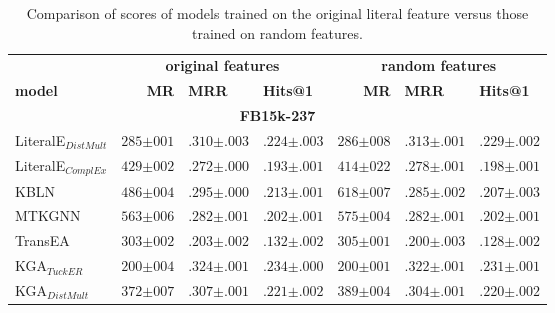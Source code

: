 
\begin{table*}[]
\setlength{\tabcolsep}{6pt}
\renewcommand{\arraystretch}{1.1}

\caption{Comparison of scores of models trained on the original literal feature versus those trained on random features.}
\label{tab:org_vs_rand}
\begin{center}
\begin{tabular}{l|rll|rll}

\hline
      & \multicolumn{3}{c|}{\textbf{original features}} & \multicolumn{3}{c}{\textbf{random features}} \\
\textbf{model}      & \textbf{MR} & \textbf{MRR} & \textbf{Hits@1} & \textbf{MR}  & \textbf{MRR} & \textbf{Hits@1} \\ \hline

\hline \multicolumn{7}{c}{\textbf{FB15k-237}} \\ \hline 
LiteralE$_{DistMult}$& $285{\scriptstyle \pm 001}$ & $.310{\scriptstyle \pm .003}$ & $.224{\scriptstyle \pm .003}$ & $286{\scriptstyle \pm 008}$ & $.313{\scriptstyle \pm .001}$ & $.229{\scriptstyle \pm .002}$  \\ 
LiteralE$_{ComplEx}$& $429{\scriptstyle \pm 002}$ & $.272{\scriptstyle \pm .000}$ & $.193{\scriptstyle \pm .001}$ & $414{\scriptstyle \pm 022}$ & $.278{\scriptstyle \pm .001}$ & $.198{\scriptstyle \pm .001}$  \\ 
KBLN& $486{\scriptstyle \pm 004}$ & $.295{\scriptstyle \pm .000}$ & $.213{\scriptstyle \pm .001}$ & $618{\scriptstyle \pm 007}$ & $.285{\scriptstyle \pm .002}$ & $.207{\scriptstyle \pm .003}$  \\ 
MTKGNN& $563{\scriptstyle \pm 006}$ & $.282{\scriptstyle \pm .001}$ & $.202{\scriptstyle \pm .001}$ & $575{\scriptstyle \pm 004}$ & $.282{\scriptstyle \pm .001}$ & $.202{\scriptstyle \pm .001}$  \\ 
TransEA& $303{\scriptstyle \pm 002}$ & $.203{\scriptstyle \pm .002}$ & $.132{\scriptstyle \pm .002}$ & $305{\scriptstyle \pm 001}$ & $.200{\scriptstyle \pm .003}$ & $.128{\scriptstyle \pm .002}$  \\ 
KGA$_{TuckER}$& $200{\scriptstyle \pm 004}$ & $.324{\scriptstyle \pm .001}$ & $.234{\scriptstyle \pm .000}$ & $200{\scriptstyle \pm 001}$ & $.322{\scriptstyle \pm .001}$ & $.231{\scriptstyle \pm .001}$  \\ 
KGA$_{DistMult}$& $372{\scriptstyle \pm 007}$ & $.307{\scriptstyle \pm .001}$ & $.221{\scriptstyle \pm .002}$ & $389{\scriptstyle \pm 004}$ & $.304{\scriptstyle \pm .001}$ & $.220{\scriptstyle \pm .002}$  \\ 

\end{tabular}
\end{center}
\end{table*}
